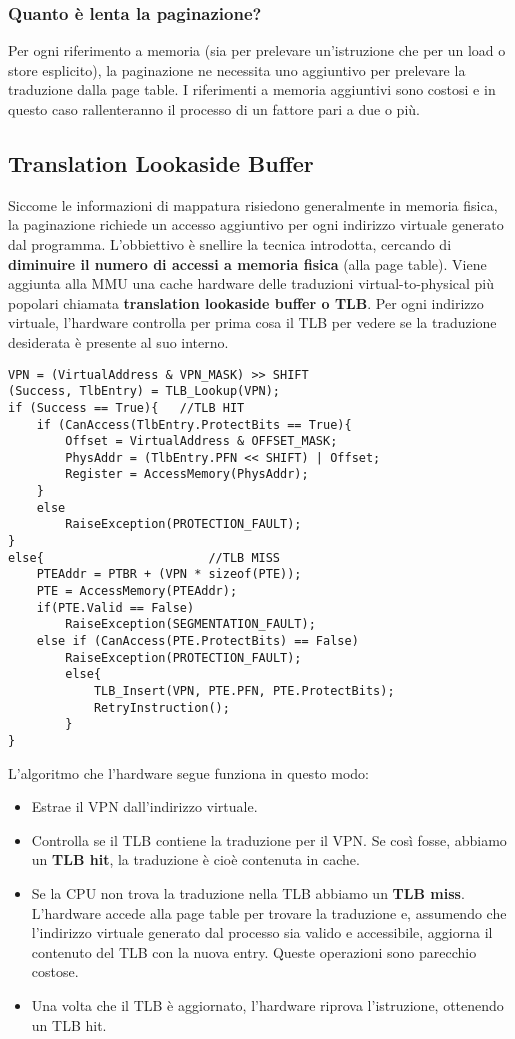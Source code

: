 \documentclass[12pt, letterpaper]{article}
\begin{document}
			\subsubsection{Quanto è lenta la paginazione?}
				Per ogni riferimento a memoria (sia per prelevare un'istruzione che per un load o store esplicito), la paginazione ne necessita uno aggiuntivo per prelevare la traduzione dalla page table. I riferimenti a memoria aggiuntivi sono costosi e in questo caso rallenteranno il processo di un fattore pari a due o più.
				
		\subsection{Translation Lookaside Buffer}
			Siccome le informazioni di mappatura risiedono generalmente in memoria fisica, la paginazione richiede un accesso aggiuntivo per ogni indirizzo virtuale generato dal programma. L'obbiettivo è snellire la tecnica introdotta, cercando di \textbf{diminuire il numero di accessi a memoria fisica }(alla page table). Viene aggiunta alla MMU una cache hardware delle traduzioni virtual-to-physical più popolari chiamata \textbf{translation lookaside buffer  o TLB}. Per ogni indirizzo virtuale, l'hardware controlla per prima cosa il TLB per vedere se la traduzione desiderata è presente al suo interno. 
			\begin{lstlisting}[style=CStyle]
VPN = (VirtualAddress & VPN_MASK) >> SHIFT
(Success, TlbEntry) = TLB_Lookup(VPN);
if (Success == True){	//TLB HIT
	if (CanAccess(TlbEntry.ProtectBits == True){
		Offset = VirtualAddress & OFFSET_MASK;
		PhysAddr = (TlbEntry.PFN << SHIFT) | Offset;
		Register = AccessMemory(PhysAddr);				
	}
	else
		RaiseException(PROTECTION_FAULT);
}	
else{						//TLB MISS
	PTEAddr = PTBR + (VPN * sizeof(PTE));	
	PTE = AccessMemory(PTEAddr);
	if(PTE.Valid == False)
		RaiseException(SEGMENTATION_FAULT);
	else if (CanAccess(PTE.ProtectBits) == False)
		RaiseException(PROTECTION_FAULT);
		else{
			TLB_Insert(VPN, PTE.PFN, PTE.ProtectBits);
			RetryInstruction();
		}								
}			\end{lstlisting}
			L'algoritmo che l'hardware segue funziona in questo modo: 
			\begin{itemize}
				\item Estrae il VPN dall'indirizzo virtuale.
				\item Controlla se il TLB contiene la traduzione per il VPN. Se così fosse, abbiamo un \textbf{TLB hit}, la traduzione è cioè contenuta in cache.
				\item Se la CPU non trova la traduzione nella TLB abbiamo un \textbf{TLB miss}. L'hardware accede alla page table per trovare la traduzione e, assumendo che l'indirizzo virtuale generato dal processo sia valido e accessibile, aggiorna il contenuto del TLB con la nuova entry. Queste operazioni sono parecchio costose.
				\item Una volta che il TLB è aggiornato, l'hardware riprova l'istruzione, ottenendo un TLB hit.
			\end{itemize}
			
\end{document}
